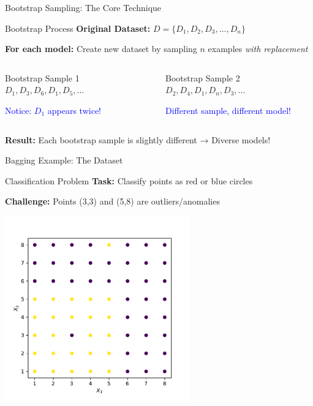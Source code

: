 \documentclass[9pt]{beamer}
\newcommand{\fitpic}[1]{\begin{adjustbox}{max width=\linewidth, max totalheight=0.78\textheight}#1\end{adjustbox}}
\begin{document}
\begin{frame}{Bootstrap Sampling: The Core Technique}
\begin{examplebox}{Bootstrap Process}
\textbf{Original Dataset:} $D = \{D_1, D_2, D_3, \ldots, D_n\}$

\textbf{For each model:} Create new dataset by sampling $n$ examples \emph{with replacement}
\end{examplebox}

\begin{columns}
\begin{column}{0.5\textwidth}
\begin{definitionbox}{Bootstrap Sample 1}
$D_1, D_3, D_6, D_1, D_5, \ldots$

\textcolor{blue}{Notice: $D_1$ appears twice!}
\end{definitionbox}
\end{column}

\begin{column}{0.5\textwidth}
\begin{definitionbox}{Bootstrap Sample 2}
$D_2, D_4, D_1, D_n, D_3, \ldots$

\textcolor{blue}{Different sample, different model!}
\end{definitionbox}
\end{column}
\end{columns}

\begin{keypointsbox}
\textbf{Result:} Each bootstrap sample is slightly different → Diverse models!
\end{keypointsbox}
\end{frame}

\begin{frame}{Bagging Example: The Dataset}
\begin{alertbox}{Classification Problem}
\textbf{Task:} Classify points as red or blue circles

\textbf{Challenge:} Points (3,3) and (5,8) are outliers/anomalies
\end{alertbox}

  \begin{center}
  \fitpic{\includegraphics[width = 0.6\textwidth]{../assets/ensemble/figures/dataset}}
  \end{center}
\end{frame}
\end{document}
